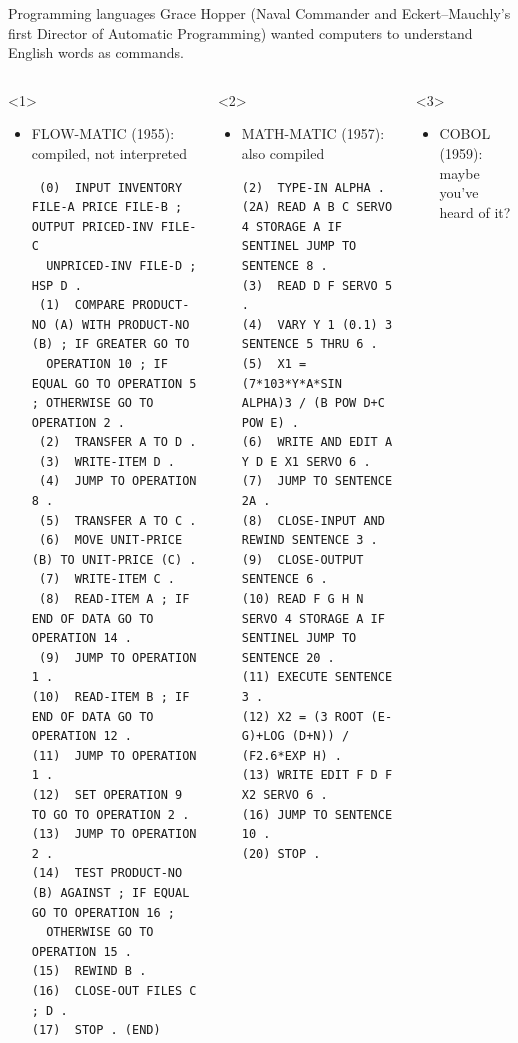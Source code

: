 \documentclass[aspectratio=169]{beamer}
\begin{document}
\begin{frame}[fragile]{Programming languages}
\vspace{0.35 cm}
Grace Hopper (Naval Commander and Eckert–Mauchly's first Director of Automatic Programming) wanted computers to understand English words as commands.

\begin{columns}
\vspace{0.25 cm}
\begin{onlyenv}<1>
\begin{itemize}
\item FLOW-MATIC (1955): compiled, not interpreted

\vspace{0.1 cm}
\tiny
\begin{verbatim}
 (0)  INPUT INVENTORY FILE-A PRICE FILE-B ; OUTPUT PRICED-INV FILE-C
  UNPRICED-INV FILE-D ; HSP D .
 (1)  COMPARE PRODUCT-NO (A) WITH PRODUCT-NO (B) ; IF GREATER GO TO
  OPERATION 10 ; IF EQUAL GO TO OPERATION 5 ; OTHERWISE GO TO OPERATION 2 .
 (2)  TRANSFER A TO D .
 (3)  WRITE-ITEM D .
 (4)  JUMP TO OPERATION 8 .
 (5)  TRANSFER A TO C .
 (6)  MOVE UNIT-PRICE (B) TO UNIT-PRICE (C) .
 (7)  WRITE-ITEM C .
 (8)  READ-ITEM A ; IF END OF DATA GO TO OPERATION 14 .
 (9)  JUMP TO OPERATION 1 .
(10)  READ-ITEM B ; IF END OF DATA GO TO OPERATION 12 .
(11)  JUMP TO OPERATION 1 .
(12)  SET OPERATION 9 TO GO TO OPERATION 2 .
(13)  JUMP TO OPERATION 2 .
(14)  TEST PRODUCT-NO (B) AGAINST ; IF EQUAL GO TO OPERATION 16 ;
  OTHERWISE GO TO OPERATION 15 .
(15)  REWIND B .
(16)  CLOSE-OUT FILES C ; D .
(17)  STOP . (END)
\end{verbatim}
\normalsize
\end{itemize}
\end{onlyenv}\begin{onlyenv}<2>
\begin{itemize}
\item MATH-MATIC (1957): also compiled

\vspace{0.1 cm}
\tiny
\begin{verbatim}
(2)  TYPE-IN ALPHA . 
(2A) READ A B C SERVO 4 STORAGE A IF SENTINEL JUMP TO SENTENCE 8 . 
(3)  READ D F SERVO 5 . 
(4)  VARY Y 1 (0.1) 3 SENTENCE 5 THRU 6 . 
(5)  X1 = (7*103*Y*A*SIN ALPHA)3 / (B POW D+C POW E) . 
(6)  WRITE AND EDIT A Y D E X1 SERVO 6 . 
(7)  JUMP TO SENTENCE 2A . 
(8)  CLOSE-INPUT AND REWIND SENTENCE 3 . 
(9)  CLOSE-OUTPUT SENTENCE 6 . 
(10) READ F G H N SERVO 4 STORAGE A IF SENTINEL JUMP TO SENTENCE 20 . 
(11) EXECUTE SENTENCE 3 . 
(12) X2 = (3 ROOT (E-G)+LOG (D+N)) / (F2.6*EXP H) . 
(13) WRITE EDIT F D F X2 SERVO 6 . 
(16) JUMP TO SENTENCE 10 . 
(20) STOP .
\end{verbatim}
\normalsize
\end{itemize}
\end{onlyenv}\begin{onlyenv}<3>
\begin{itemize}
\item COBOL (1959): maybe you've heard of it?


\end{itemize}
\end{onlyenv}
\end{columns}
\end{frame}
\end{document}
